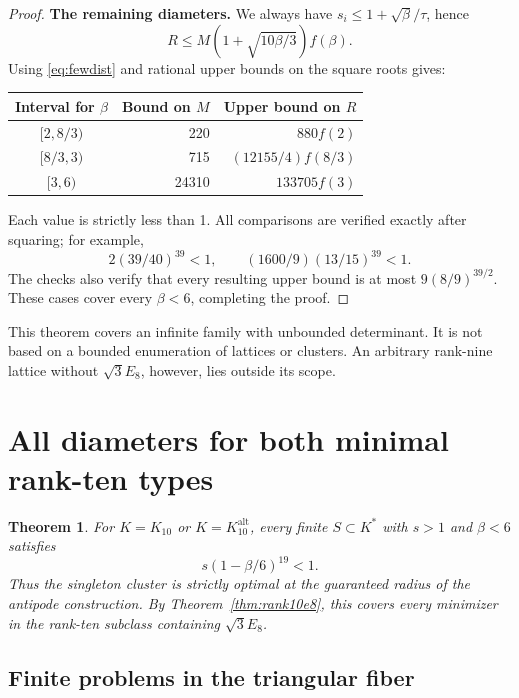 \documentclass[11pt,a4paper]{article}
\newtheorem{theorem}{Theorem}[section]
\theoremstyle{remark}\newtheorem{remark}[theorem]{Remark}
\newcommand{\Kalt}{K_{10}^{\mathrm{alt}}}
\begin{document}
\begin{proof}
\textbf{The remaining diameters.} We always have $s_i\le1+\sqrt\beta/\tau$, hence
\[
R\le M(1+\sqrt{10\beta/3})f(\beta).
\]
Using \eqref{eq:fewdist} and rational upper bounds on the square roots gives:
\begin{center}
\begin{tabular}{crr}
\toprule
Interval for $\beta$ & Bound on $M$ & Upper bound on $R$\\\midrule
$[2,8/3)$ &220&$880f(2)$\\
$[8/3,3)$ &715&$(12155/4)f(8/3)$\\
$[3,6)$ &24310&$133705f(3)$\\
\bottomrule
\end{tabular}
\end{center}
Each value is strictly less than 1. All comparisons are verified exactly after squaring; for example,
\[
2(39/40)^{39}<1,\qquad (1600/9)(13/15)^{39}<1.
\]
The checks also verify that every resulting upper bound is at most $9(8/9)^{39/2}$. These cases cover every $\beta<6$, completing the proof.
\end{proof}

This theorem covers an infinite family with unbounded determinant. It is not based on a bounded enumeration of lattices or clusters. An arbitrary rank-nine lattice without $\sqrt3E_8$, however, lies outside its scope.

\section{All diameters for both minimal rank-ten types}

\begin{theorem}\label{thm:cluster10}
For $K=K_{10}$ or $K=\Kalt$, every finite $S\subset K^*$ with $s>1$ and $\beta<6$ satisfies
\[
s(1-\beta/6)^{19}<1.
\]
Thus the singleton cluster is strictly optimal at the guaranteed radius of the antipode construction. By Theorem~\ref{thm:rank10e8}, this covers every minimizer in the rank-ten subclass containing $\sqrt3E_8$.
\end{theorem}

\subsection{Finite problems in the triangular fiber}
\end{document}
